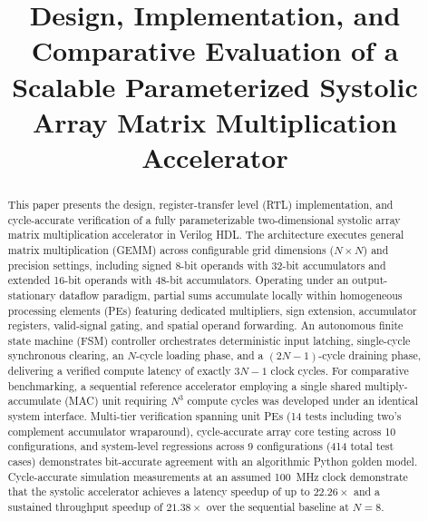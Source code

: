 \documentclass[conference]{IEEEtran}
\begin{document}
\title{Design, Implementation, and Comparative Evaluation of a Scalable Parameterized Systolic Array Matrix Multiplication Accelerator}

\author{
}

\maketitle

\begin{abstract}
This paper presents the design, register-transfer level (RTL) implementation, and cycle-accurate verification of a fully parameterizable two-dimensional systolic array matrix multiplication accelerator in Verilog HDL. The architecture executes general matrix multiplication (GEMM) across configurable grid dimensions ($N \times N$) and precision settings, including signed 8-bit operands with 32-bit accumulators and extended 16-bit operands with 48-bit accumulators. Operating under an output-stationary dataflow paradigm, partial sums accumulate locally within homogeneous processing elements (PEs) featuring dedicated multipliers, sign extension, accumulator registers, valid-signal gating, and spatial operand forwarding. An autonomous finite state machine (FSM) controller orchestrates deterministic input latching, single-cycle synchronous clearing, an $N$-cycle loading phase, and a $(2N-1)$-cycle draining phase, delivering a verified compute latency of exactly $3N-1$ clock cycles. For comparative benchmarking, a sequential reference accelerator employing a single shared multiply-accumulate (MAC) unit requiring $N^3$ compute cycles was developed under an identical system interface. Multi-tier verification spanning unit PEs (14 tests including two's complement accumulator wraparound), cycle-accurate array core testing across 10 configurations, and system-level regressions across 9 configurations (414 total test cases) demonstrates bit-accurate agreement with an algorithmic Python golden model. Cycle-accurate simulation measurements at an assumed 100~MHz clock demonstrate that the systolic accelerator achieves a latency speedup of up to $22.26\times$ and a sustained throughput speedup of $21.38\times$ over the sequential baseline at $N=8$.
\end{abstract}
\end{document}
